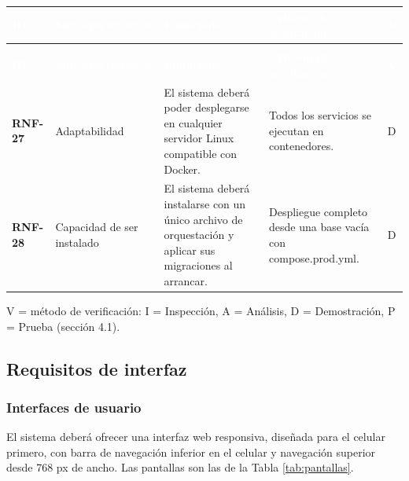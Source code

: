 \documentclass[11pt,a4paper,oneside]{article}
\newcommand{\nota}[1]{\begin{center}\colorbox{claro}{\parbox{0.96\textwidth}{\small\sffamily #1}}\end{center}}
\begin{document}
{\footnotesize
\begin{xltabular}{\textwidth}{@{}>{\sffamily\bfseries}p{1.45cm}>{\raggedright\arraybackslash}p{2.4cm}YY>{\raggedright\arraybackslash}p{0.45cm}@{}}
\textcolor{white}{\sffamily\bfseries\footnotesize ID} & \textcolor{white}{\sffamily\bfseries\footnotesize Subcaracterística} & \textcolor{white}{\sffamily\bfseries\footnotesize Enunciado} & \textcolor{white}{\sffamily\bfseries\footnotesize Criterio de aceptación} & \textcolor{white}{\sffamily\bfseries\footnotesize V}\\
\endfirsthead
{}\\
\textcolor{white}{\sffamily\bfseries\footnotesize ID} & \textcolor{white}{\sffamily\bfseries\footnotesize Subcaracterística} & \textcolor{white}{\sffamily\bfseries\footnotesize Enunciado} & \textcolor{white}{\sffamily\bfseries\footnotesize Criterio de aceptación} & \textcolor{white}{\sffamily\bfseries\footnotesize V}\\
\endhead
RNF-27 & Adaptabilidad & El sistema deberá poder desplegarse en cualquier servidor Linux compatible con Docker. & Todos los servicios se ejecutan en contenedores. & D\\ \hline
{}RNF-28 & Capacidad de ser instalado & El sistema deberá instalarse con un único archivo de orquestación y aplicar sus migraciones al arrancar. & Despliegue completo desde una base vacía con compose.prod.yml. & D\\ \hline
\end{xltabular}}
\vspace{0.6em}

\nota{V = método de verificación: I = Inspección, A = Análisis, D = Demostración, P = Prueba (sección 4.1).}

\subsection{Requisitos de interfaz}

\subsubsection{Interfaces de usuario}

El sistema deberá ofrecer una interfaz web responsiva, diseñada para el celular primero, con barra de navegación inferior en el celular y navegación superior desde 768 px de ancho. Las pantallas son las de la Tabla \ref{tab:pantallas}.
\end{document}
